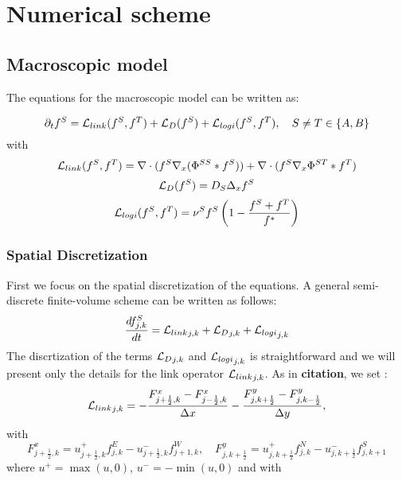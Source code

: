 	\section{Numerical scheme}
	\subsection{Macroscopic model}
	
The equations for the macroscopic model can be written as:

\begin{equation}
 {\partial}_t f^{S}={\mathcal{L}_{link}}(f^S,f^T)+{\mathcal{L}_{D}}(f^S)+{\mathcal{L}_{logi}}(f^S,f^T), \quad S\neq T\in\{A,B\}
\end{equation}
with
\begin{equation}
{\mathcal{L}_{link}}(f^S,f^T)=  \nabla \cdot (f^S\nabla_x(\Phi^{SS}* f^S)) + \nabla \cdot (f^S \nabla_x \Phi^{ST}*f^T)
\end{equation}
\begin{equation}
{\mathcal{L}_{D}}(f^S)= D_S \Delta_x f^S
\end{equation}
\begin{equation}
{\mathcal{L}_{logi}}(f^S,f^T)=\nu^{S}f^S\left( 1-\frac{f^S+f^T}{f^{*}} \right)
\end{equation}


\subsubsection{Spatial Discretization}


First we focus on the spatial discretization of the equations. A general semi-discrete finite-volume scheme can be written as follows:
\begin{equation}
\frac{d f^{S}_{j,k}}{dt}={\mathcal{L}_{link}}_{j,k}+{\mathcal{L}_{D}}_{j,k}+{\mathcal{L}_{logi}}_{j,k}
\end{equation}
The discrtization of the terms ${\mathcal{L}_{D}}_{j,k}$ and ${\mathcal{L}_{logi}}_{j,k}$ is straightforward and we will present only the details for the link operator ${\mathcal{L}_{link}}_{j,k}$. As in \textbf{citation}, we set :
\begin{equation}
{\mathcal{L}_{link}}_{j,k}= -\frac{F^{x}_{j+\frac{1}{2},k}-F^{x}_{j-\frac{1}{2},k}}{\Delta x}-\frac{F^{y}_{j,k+\frac{1}{2}}-F^{y}_{j,k-\frac{1}{2}}}{\Delta y},
\end{equation}
with
\begin{equation*}
 F^{x}_{j+\frac{1}{2},k}=u^{+}_{j+\frac{1}{2},k}f^{E}_{j,k}-
u^{-}_{j+\frac{1}{2},k}f^{W}_{j+1,k}, \quad F^{y}_{j,k+\frac{1}{2}}=u^{+}_{j,k+\frac{1}{2}}f^{N}_{j,k}-
u^{-}_{j,k+\frac{1}{2}}f^{S}_{j,k+1}
\end{equation*}
where $u^{+}=\max(u,0)$, $u^{-}=-\min(u,0)$ and with 

